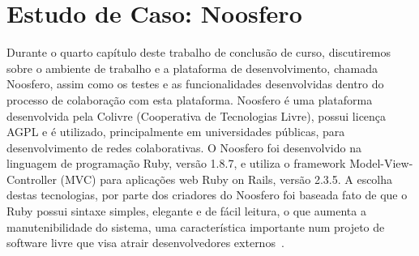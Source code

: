 \chapter{Estudo de Caso: Noosfero}
\label{noosfero}
Durante o quarto capítulo deste trabalho de conclusão de curso, discutiremos sobre 
o ambiente de trabalho e a plataforma de desenvolvimento, chamada Noosfero, assim 
como os testes e as funcionalidades desenvolvidas dentro do processo de colaboração 
com esta plataforma.
%
Noosfero é uma plataforma desenvolvida pela Colivre (Cooperativa de Tecnologias
Livre), possui licença AGPL e é utilizado, principalmente em universidades públicas,
para desenvolvimento de redes colaborativas. %
%
O Noosfero foi desenvolvido na linguagem de programação Ruby, versão 1.8.7, e utiliza
o framework Model-View-Controller (MVC) para aplicações web Ruby on Rails, versão 
2.3.5. A escolha destas tecnologias, por parte dos criadores do Noosfero foi baseada 
fato de que o Ruby possui sintaxe simples, elegante e de fácil leitura, o que aumenta
a manutenibilidade do sistema, uma característica importante num projeto de software
livre que visa atrair desenvolvedores externos~\cite{meirelles2013}.

